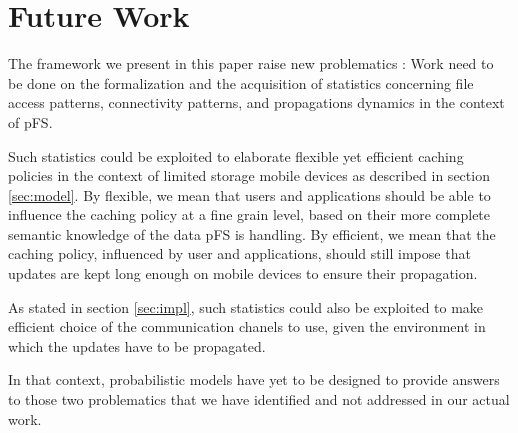 
\section{Future Work}
\label{sec:futwk}

The framework we present in this paper raise new problematics : Work
need to be done on the formalization and the acquisition of statistics
concerning file access patterns, connectivity patterns, and
propagations dynamics in the context of pFS. 

Such statistics could be exploited to elaborate flexible yet efficient
caching policies in the context of limited storage mobile devices as
described in section \ref{sec:model}. By flexible, we mean that users
and applications should be able to influence the caching policy at a
fine grain level, based on their more complete semantic knowledge of
the data pFS is handling. By efficient, we mean that the caching
policy, influenced by user and applications, should still impose that
updates are kept long enough on mobile devices to ensure their
propagation.

As stated in section \ref{sec:impl}, such statistics could also be
exploited to make efficient choice of the communication chanels to use,
given the environment in which the updates have to be propagated.

In that context, probabilistic models have yet to be designed to
provide answers to those two problematics that we have identified and
not addressed in our actual work.


